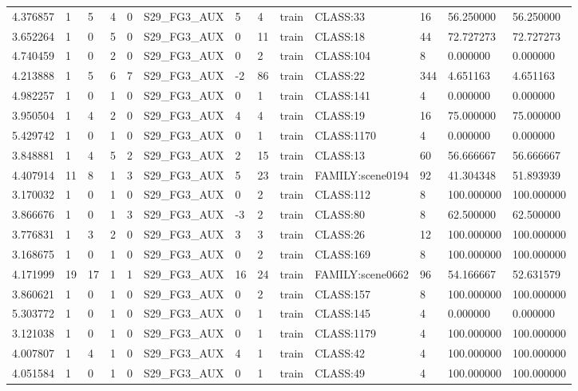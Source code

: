 \begin{tabular}{lllllllllllll}
4.376857 & 1 & 5 & 4 & 0 & S29\_FG3\_AUX & 5 & 4 & train & CLASS:33 & 16 & 56.250000 & 56.250000 \\
3.652264 & 1 & 0 & 5 & 0 & S29\_FG3\_AUX & 0 & 11 & train & CLASS:18 & 44 & 72.727273 & 72.727273 \\
4.740459 & 1 & 0 & 2 & 0 & S29\_FG3\_AUX & 0 & 2 & train & CLASS:104 & 8 & 0.000000 & 0.000000 \\
4.213888 & 1 & 5 & 6 & 7 & S29\_FG3\_AUX & -2 & 86 & train & CLASS:22 & 344 & 4.651163 & 4.651163 \\
4.982257 & 1 & 0 & 1 & 0 & S29\_FG3\_AUX & 0 & 1 & train & CLASS:141 & 4 & 0.000000 & 0.000000 \\
3.950504 & 1 & 4 & 2 & 0 & S29\_FG3\_AUX & 4 & 4 & train & CLASS:19 & 16 & 75.000000 & 75.000000 \\
5.429742 & 1 & 0 & 1 & 0 & S29\_FG3\_AUX & 0 & 1 & train & CLASS:1170 & 4 & 0.000000 & 0.000000 \\
3.848881 & 1 & 4 & 5 & 2 & S29\_FG3\_AUX & 2 & 15 & train & CLASS:13 & 60 & 56.666667 & 56.666667 \\
4.407914 & 11 & 8 & 1 & 3 & S29\_FG3\_AUX & 5 & 23 & train & FAMILY:scene0194 & 92 & 41.304348 & 51.893939 \\
3.170032 & 1 & 0 & 1 & 0 & S29\_FG3\_AUX & 0 & 2 & train & CLASS:112 & 8 & 100.000000 & 100.000000 \\
3.866676 & 1 & 0 & 1 & 3 & S29\_FG3\_AUX & -3 & 2 & train & CLASS:80 & 8 & 62.500000 & 62.500000 \\
3.776831 & 1 & 3 & 2 & 0 & S29\_FG3\_AUX & 3 & 3 & train & CLASS:26 & 12 & 100.000000 & 100.000000 \\
3.168675 & 1 & 0 & 1 & 0 & S29\_FG3\_AUX & 0 & 2 & train & CLASS:169 & 8 & 100.000000 & 100.000000 \\
4.171999 & 19 & 17 & 1 & 1 & S29\_FG3\_AUX & 16 & 24 & train & FAMILY:scene0662 & 96 & 54.166667 & 52.631579 \\
3.860621 & 1 & 0 & 1 & 0 & S29\_FG3\_AUX & 0 & 2 & train & CLASS:157 & 8 & 100.000000 & 100.000000 \\
5.303772 & 1 & 0 & 1 & 0 & S29\_FG3\_AUX & 0 & 1 & train & CLASS:145 & 4 & 0.000000 & 0.000000 \\
3.121038 & 1 & 0 & 1 & 0 & S29\_FG3\_AUX & 0 & 1 & train & CLASS:1179 & 4 & 100.000000 & 100.000000 \\
4.007807 & 1 & 4 & 1 & 0 & S29\_FG3\_AUX & 4 & 1 & train & CLASS:42 & 4 & 100.000000 & 100.000000 \\
4.051584 & 1 & 0 & 1 & 0 & S29\_FG3\_AUX & 0 & 1 & train & CLASS:49 & 4 & 100.000000 & 100.000000 \\

\end{tabular}

